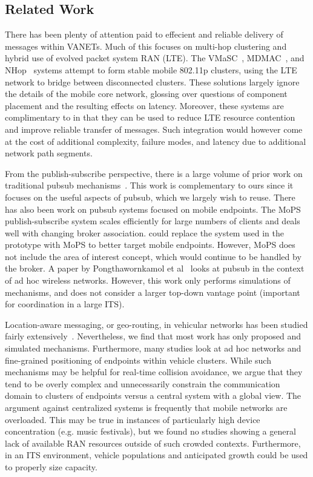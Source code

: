 \subsection{Related Work}

There has been plenty of attention paid to effecient and reliable
delivery of messages within VANETs.  Much of this focuses on multi-hop
clustering and hybrid use of evolved packet system RAN (LTE).  The
VMaSC~\cite{ucar2016multihop}, MDMAC~\cite{wolny2008modified}, and
NHop~\cite{zhang2011novel} systems attempt to form stable mobile
802.11p clusters, using the LTE network to bridge between disconnected
clusters. These solutions largely ignore the details of the mobile
core network, glossing over questions of component placement and the
resulting effects on latency. Moreover, these systems are
complimentary to \name in that they can be used to reduce LTE
resource contention and improve reliable transfer of messages. Such
integration would however come at the cost of additional complexity,
failure modes, and latency due to additional network path segments.

From the publish-subscribe perspective, there is a large volume of
prior work on traditional pubsub mechanisms~\cite{ps1,ps2,ps3,ps4}.
This work is complementary to ours since it focuses on the useful
aspects of pubsub, which we largely wish to reuse. There has also been
work on pubsub systems focused on mobile endpoints. The
MoPS~\cite{nasim2014mobile} publish-subscribe system scales
efficiently for large numbers of clients and deals well with changing
broker association.  \name could replace the \pubsub system used in
the prototype with MoPS to better target mobile endpoints. However,
MoPS does not include the area of interest concept, which would
continue to be handled by the \name broker. A paper by
Pongthawornkamol et al~\cite{pongthawornkamol2007analysis} looks at
pubsub in the context of ad hoc wireless networks. However, this work
only performs simulations of mechanisms, and does not consider a
larger top-down vantage point (important for coordination in a large
ITS).

Location-aware messaging, or geo-routing, in vehicular networks has
been studied fairly extensively~\cite{bilal2013position}.
Nevertheless, we find that most work has only proposed and simulated
mechanisms. Furthermore, many studies look at ad hoc networks and
fine-grained positioning of endpoints within vehicle clusters.  While
such mechanisms may be helpful for real-time collision avoidance, we
argue that they tend to be overly complex and unnecessarily constrain
the communication domain to clusters of endpoints versus a central
system with a global view. The argument against centralized systems is
frequently that mobile networks are overloaded. This may be true in
instances of particularly high device concentration (e.g. music
festivals), but we found no studies showing a general lack of
available RAN resources outside of such crowded contexts.
Furthermore, in an ITS environment, vehicle populations and
anticipated growth could be used to properly size capacity.

